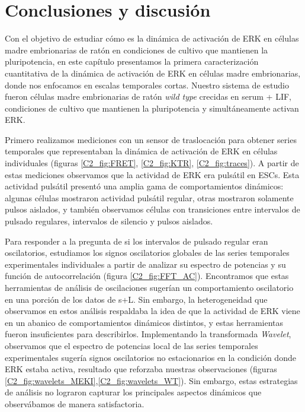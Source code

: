 \documentclass[./main.tex]{subfiles}
\begin{document}
\section{Conclusiones y discusión}

Con el objetivo de estudiar cómo es la dinámica de activación de ERK en células madre embrionarias de ratón en condiciones de cultivo que mantienen la pluripotencia, en este capítulo presentamos la primera caracterización cuantitativa de la dinámica de activación de ERK en células madre embrionarias, donde nos enfocamos en escalas temporales cortas. Nuestro sistema de estudio fueron células madre embrionarias de ratón \textit{wild type} crecidas en serum + LIF, condiciones de cultivo que mantienen la pluripotencia y simultáneamente activan ERK. 


Primero realizamos mediciones con un sensor de traslocación para obtener series temporales que representaban la dinámica de activación de ERK en células individuales (figuras \ref{C2_fig:FRET}, \ref{C2_fig:KTR}, \ref{C2_fig:traces}). A partir de estas mediciones observamos que la actividad de ERK era pulsátil en ESCs. Esta actividad pulsátil presentó una amplia gama de comportamientos dinámicos: algunas células mostraron actividad pulsátil regular, otras mostraron solamente pulsos aislados, y también observamos células con transiciones entre intervalos de pulsado regulares, intervalos de silencio y pulsos aislados. 


Para responder a la pregunta de si los intervalos de pulsado regular eran oscilatorios, estudiamos los signos oscilatorios globales de las series temporales experimentales individuales a partir de analizar su espectro de potencias y su función de autocorrelación (figura \ref{C2_fig:FFT_AC}). Encontramos que estas herramientas de análisis de oscilaciones sugerían un comportamiento oscilatorio en una porción de los datos de s+L. Sin embargo, la heterogeneidad que observamos en estos análisis respaldaba la idea de que la actividad de ERK viene en un abanico de comportamientos dinámicos distintos, y estas herramientas fueron insuficientes para describirlos. Implementando la transformada \textit{Wavelet}, observamos que el espectro de potencias local de las series temporales experimentales sugería signos oscilatorios no estacionarios en la condición donde ERK estaba activa, resultado que reforzaba nuestras observaciones (figuras \ref{C2_fig:wavelets_MEKI},\ref{C2_fig:wavelets_WT}). Sin embargo, estas estrategias de análisis no lograron capturar los principales aspectos dinámicos 
 que observábamos de manera satisfactoria. 
 
\end{document}
